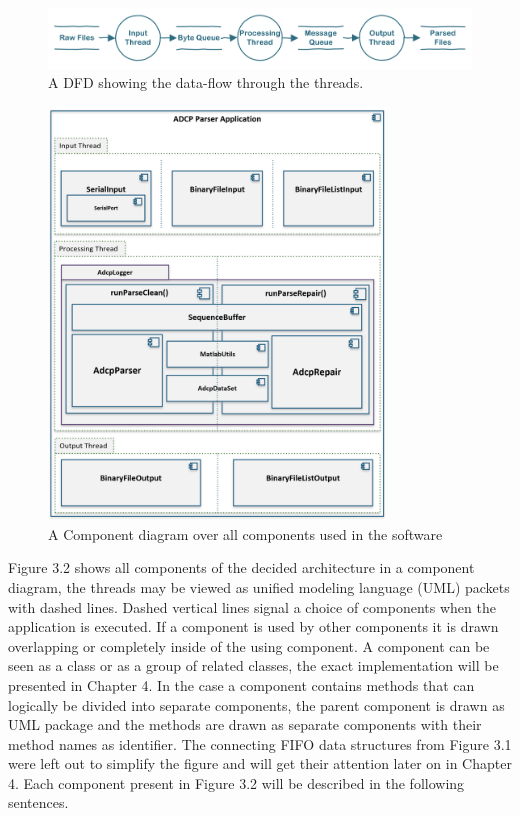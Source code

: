 \begin{figure}[ht]
\centering
      \includegraphics[width=1\textwidth]{dfd}
        \caption{A DFD showing the data-flow through the threads.}
\end{figure}

\begin{figure}[ht]
\centering
      \includegraphics[width=0.8\textwidth]{all_components}
        \caption{A Component diagram over all components used in the software}
\end{figure}

Figure 3.2 shows all components of the decided architecture in a component diagram, the threads may be viewed as unified modeling language (UML) packets with dashed lines. Dashed vertical lines signal a choice of components when the application is executed. If a component is used by other components it is drawn overlapping or completely inside of the using component. A component can be seen as a class or as a group of related classes, the exact implementation will be presented in Chapter 4. In the case a component contains methods that can logically be divided into separate components, the parent component is drawn as UML package and the methods are drawn as separate components with their method names as identifier. The connecting FIFO data structures from Figure 3.1 were left out to simplify the figure and will get their attention later on in Chapter 4. Each component present in Figure 3.2 will be described in the following sentences. 
\vspace{3em}

